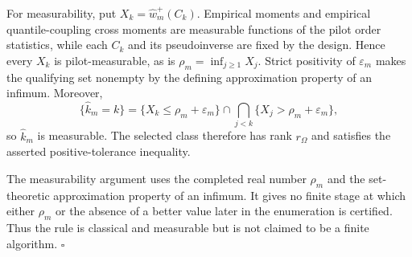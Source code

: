 For measurability, put \(X_k=\widehat w_m^+(C_k)\).  Empirical moments and empirical quantile-coupling cross moments are measurable functions of the pilot order statistics, while each \(C_k\) and its pseudoinverse are fixed by the design.  Hence every \(X_k\) is pilot-measurable, as is \(\rho_m=\inf_{j\ge1}X_j\).  Strict positivity of \(\varepsilon_m\) makes the qualifying set nonempty by the defining approximation property of an infimum.  Moreover,
\[
\{\widehat k_m=k\}
=\{X_k\le\rho_m+\varepsilon_m\}
\cap\bigcap_{j<k}\{X_j>\rho_m+\varepsilon_m\},
\tag{8}
\]
so \(\widehat k_m\) is measurable.  The selected class therefore has rank \(r_\Omega\) and satisfies the asserted positive-tolerance inequality.

The measurability argument uses the completed real number \(\rho_m\) and the set-theoretic approximation property of an infimum.  It gives no finite stage at which either \(\rho_m\) or the absence of a better value later in the enumeration is certified.  Thus the rule is classical and measurable but is not claimed to be a finite algorithm. \(\square\)